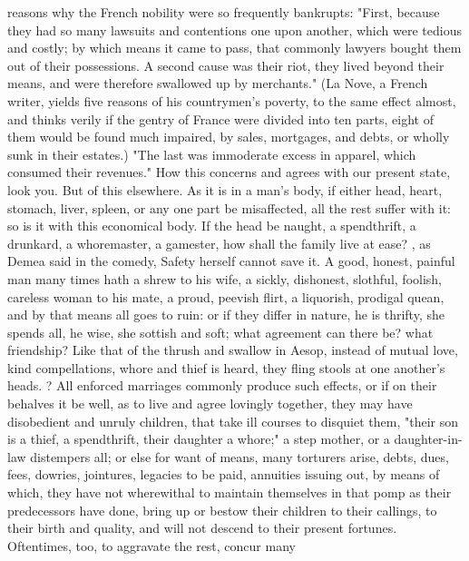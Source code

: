 reasons why the French nobility were so frequently bankrupts: "First, because
they had so many lawsuits and contentions one upon another, which were tedious
and costly; by which means it came to pass, that commonly lawyers bought them
out of their possessions. A second cause was their riot, they lived beyond
their means, and were therefore swallowed up by merchants." (La Nove, a French
writer, yields five reasons of his countrymen's poverty, to the same effect
almost, and thinks verily if the gentry of France were divided into ten parts,
eight of them would be found much impaired, by sales, mortgages, and debts, or
wholly sunk in their estates.) "The last was immoderate excess in apparel,
which consumed their revenues." How this concerns and agrees with our present
state, look you. But of this elsewhere. As it is in a man's body, if either
head, heart, stomach, liver, spleen, or any one part be misaffected, all the
rest suffer with it: so is it with this economical body. If the head be naught,
a spendthrift, a drunkard, a whoremaster, a gamester, how shall the family live
at ease? , as Demea said in the comedy, Safety herself cannot save
it. A good, honest, painful man many times hath a shrew to his wife, a sickly,
dishonest, slothful, foolish, careless woman to his mate, a proud, peevish
flirt, a liquorish, prodigal quean, and by that means all goes to ruin: or if
they differ in nature, he is thrifty, she spends all, he wise, she sottish and
soft; what agreement can there be? what friendship? Like that of the thrush and
swallow in Aesop, instead of mutual love, kind compellations, whore and thief
is heard, they fling stools at one another's heads.
? All enforced
marriages commonly produce such effects, or if on their behalves it be well, as
to live and agree lovingly together, they may have disobedient and unruly
children, that take ill courses to disquiet them, "their
son is a thief, a spendthrift, their daughter a whore;" a step
mother, or a daughter-in-law distempers all;
or else for want of means, many torturers arise, debts,
dues, fees, dowries, jointures, legacies to be paid, annuities issuing out, by
means of which, they have not wherewithal to maintain themselves in that pomp
as their predecessors have done, bring up or bestow their children to their
callings, to their birth and quality, and will not descend
to their present fortunes. Oftentimes, too, to aggravate the rest, concur many
